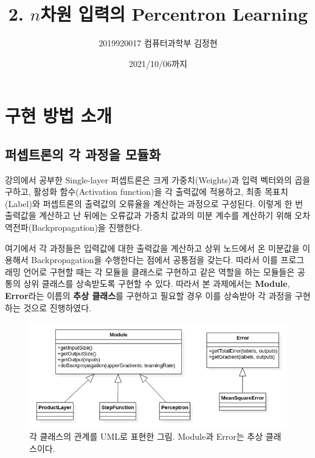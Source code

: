 \documentclass[letterpaper,10pt]{article}
\begin{document}
	
	\title{2. $n$차원 입력의 Percentron Learning}
	\author{2019920017 컴퓨터과학부 김정현}
	\date{2021/10/06까지}
	\maketitle
	
	\section{구현 방법 소개}
	
	\subsection{퍼셉트론의 각 과정을 모듈화}

		강의에서 공부한 Single-layer 퍼셉트론은 크게 가중치(Weights)과 입력 벡터와의 곱을 구하고, 활성화 함수(Activation function)을 각 출력값에 적용하고, 최종 목표치(Label)와 퍼셉트론의 출력값의 오류율을 계산하는 과정으로 구성된다. 이렇게 한 번 출력값을 계산하고 난 뒤에는 오류값과 가중치 값과의 미분 계수를 계산하기 위해 오차 역전파(Backpropagation)을 진행한다.
		
		여기에서 각 과정들은 입력값에 대한 출력값을 계산하고 상위 노드에서 온 미분값을 이용해서 Backpropagation을 수행한다는 점에서 공통점을 갖는다. 따라서 이를 프로그래밍 언어로 구현할 때는 각 모듈을 클래스로 구현하고 같은 역할을 하는 모듈들은 공통의 상위 클래스를 상속받도록 구현할 수 있다. 따라서 본 과제에서는 \textbf{Module}, \textbf{Error}라는 이름의 \textbf{추상 클래스}를 구현하고 필요할 경우 이를 상속받아 각 과정을 구현하는 것으로 진행하였다.
		
		\begin{figure}[h]
			\centering
			\includegraphics[width=0.7\linewidth]{images/UML.png}
			\caption{각 클래스의 관계를 UML로 표현한 그림. Module과 Error는 추상 클래스이다.}
		\end{figure}
	
\end{document}

